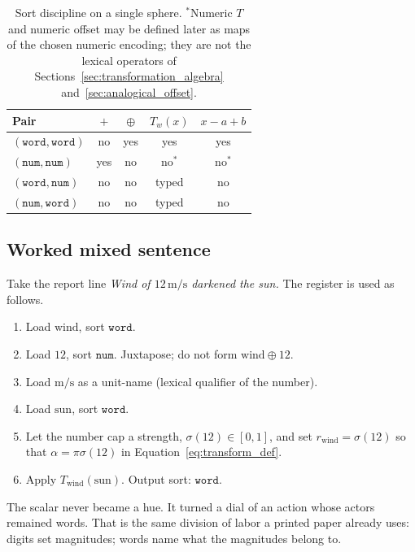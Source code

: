 \documentclass[12pt, a4paper]{article}
\begin{document}
\begin{table}[h]
\centering
\begin{tabular}{lcccc}
\hline
Pair & $+$ & $\oplus$ & $T_w(x)$ & $x-a+b$ \\
\hline
$(\mathtt{word},\mathtt{word})$ & no & yes & yes & yes \\
$(\mathtt{num},\mathtt{num})$   & yes & no  & no$^{*}$ & no$^{*}$ \\
$(\mathtt{word},\mathtt{num})$  & no & no  & typed & no \\
$(\mathtt{num},\mathtt{word})$  & no & no  & typed & no \\
\hline
\end{tabular}
\caption{Sort discipline on a single sphere.
$^{*}$Numeric $T$ and numeric offset may be defined later as
maps of the chosen numeric encoding; they are not the lexical
operators of Sections~\ref{sec:transformation_algebra}
and~\ref{sec:analogical_offset}.}
\label{tab:type_table}
\end{table}

\subsection{Worked mixed sentence}
\label{subsec:mixed_sentence}
Take the report line \emph{Wind of $12\,\mathrm{m/s}$ darkened the sun.}
The register is used as follows.

\begin{enumerate}
    \item Load $\mathrm{wind}$, sort $\mathtt{word}$.
    \item Load $12$, sort $\mathtt{num}$. Juxtapose; do not form
          $\mathrm{wind}\oplus 12$.
    \item Load $\mathrm{m/s}$ as a unit-name (lexical qualifier of the
          number).
    \item Load $\mathrm{sun}$, sort $\mathtt{word}$.
    \item Let the number cap a strength,
          $\sigma(12)\in[0,1]$, and set
          $r_{\mathrm{wind}}=\sigma(12)$ so that
          $\alpha=\pi\sigma(12)$ in Equation~\eqref{eq:transform_def}.
    \item Apply $T_{\mathrm{wind}}(\mathrm{sun})$. Output sort:
          $\mathtt{word}$.
\end{enumerate}
The scalar never became a hue. It turned a dial of an action whose
actors remained words. That is the same division of labor a printed
paper already uses: digits set magnitudes; words name what the
magnitudes belong to.
\end{document}
